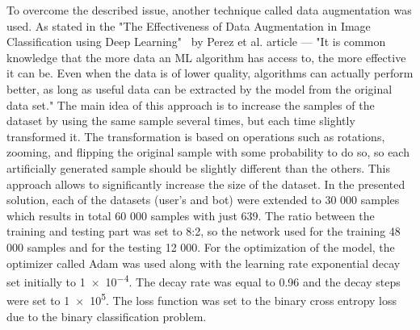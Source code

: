 To overcome the described issue, another technique called data augmentation was used.
As stated in the "The Effectiveness of Data Augmentation in Image Classification using Deep Learning"~\cite{augmentation} by Perez et al. article --- "It is common knowledge that the more data an ML algorithm has access to, the more effective it can be.
Even when the data is of lower quality, algorithms can actually perform better, as long as useful data can be extracted by the model from the original data set."
The main idea of this approach is to increase the samples of the dataset by using the same sample several times, but each time slightly transformed it.
The transformation is based on operations such as rotations, zooming, and flipping the original sample with some probability to do so, so each artificially generated sample should be slightly different than the others.
This approach allows to significantly increase the size of the dataset.
In the presented solution, each of the datasets (user's and bot) were extended to 30 000 samples which results in total 60 000 samples with just 639.
The ratio between the training and testing part was set to 8:2, so the network used for the training 48 000 samples and for the testing 12 000.
For the optimization of the model, the optimizer called Adam was used along with the learning rate exponential decay set initially to \num{1e-4}.
The decay rate was equal to \num{0.96} and the decay steps were set to \num{1e5}.
The loss function was set to the binary cross entropy loss due to the binary classification problem.